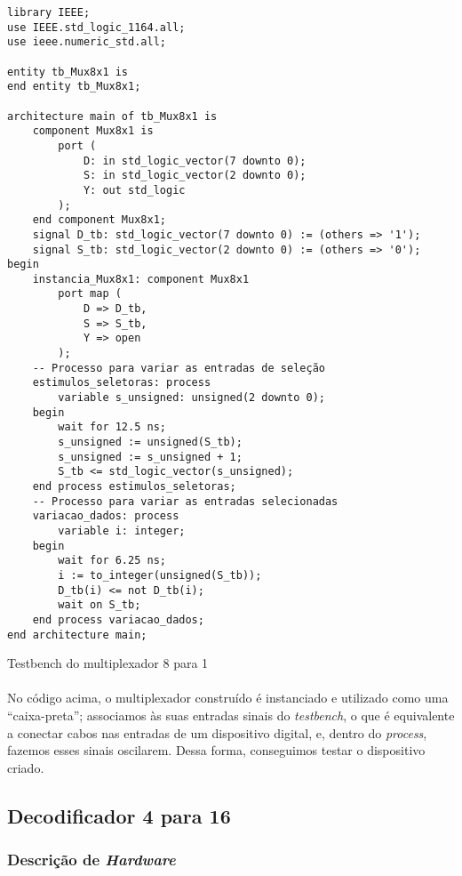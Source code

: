 \documentclass[a4paper,12pt]{article}
\newenvironment{code}{\captionsetup{type=listing}}{}
\begin{document}
\begin{code}
\begin{verbatim}
library IEEE;
use IEEE.std_logic_1164.all;
use ieee.numeric_std.all;

entity tb_Mux8x1 is
end entity tb_Mux8x1;

architecture main of tb_Mux8x1 is
    component Mux8x1 is
        port (
            D: in std_logic_vector(7 downto 0);
            S: in std_logic_vector(2 downto 0);
            Y: out std_logic
        );
    end component Mux8x1;
    signal D_tb: std_logic_vector(7 downto 0) := (others => '1');
    signal S_tb: std_logic_vector(2 downto 0) := (others => '0');
begin
    instancia_Mux8x1: component Mux8x1
        port map (
            D => D_tb,
            S => S_tb,
            Y => open
        );
    -- Processo para variar as entradas de seleção
    estimulos_seletoras: process
        variable s_unsigned: unsigned(2 downto 0);
    begin
        wait for 12.5 ns;
        s_unsigned := unsigned(S_tb);
        s_unsigned := s_unsigned + 1;
        S_tb <= std_logic_vector(s_unsigned);
    end process estimulos_seletoras;
    -- Processo para variar as entradas selecionadas
    variacao_dados: process
        variable i: integer;
    begin
        wait for 6.25 ns;
        i := to_integer(unsigned(S_tb));
        D_tb(i) <= not D_tb(i);
        wait on S_tb;
    end process variacao_dados;
end architecture main;
\end{verbatim}
\caption{Testbench do multiplexador 8 para 1}
\label{cod:testbench_mux}
\end{code}

\paragraph{}
No código acima, o multiplexador construído é instanciado e utilizado como uma ``caixa-preta''; associamos às suas entradas sinais do \textit{testbench}, o que é equivalente a conectar cabos nas entradas de um dispositivo digital, e, dentro do \textit{process}, fazemos esses sinais oscilarem. Dessa forma, conseguimos testar o dispositivo criado.

\subsection{Decodificador 4 para 16}
\subsubsection{Descrição de \textit{Hardware}}
\end{document}

